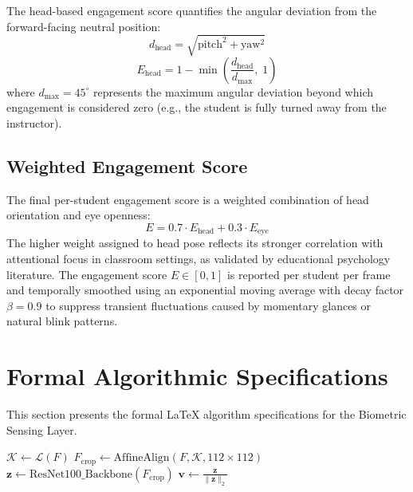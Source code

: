 \documentclass[12pt,a4paper,oneside]{report}
\begin{document}
The head-based engagement score quantifies the angular deviation from the forward-facing neutral position:
\begin{equation}
    d_{\text{head}} = \sqrt{\text{pitch}^2 + \text{yaw}^2}
\end{equation}
\begin{equation}
    E_{\text{head}} = 1 - \min\left(\frac{d_{\text{head}}}{d_{\max}},\; 1\right)
\end{equation}
where $d_{\max} = 45^{\circ}$ represents the maximum angular deviation beyond which engagement is considered zero (e.g., the student is fully turned away from the instructor).

\subsection{Weighted Engagement Score}
The final per-student engagement score is a weighted combination of head orientation and eye openness:
\begin{equation}
    E = 0.7 \cdot E_{\text{head}} + 0.3 \cdot E_{\text{eye}}
\end{equation}
The higher weight assigned to head pose reflects its stronger correlation with attentional focus in classroom settings, as validated by educational psychology literature. The engagement score $E \in [0, 1]$ is reported per student per frame and temporally smoothed using an exponential moving average with decay factor $\beta = 0.9$ to suppress transient fluctuations caused by momentary glances or natural blink patterns.



\section{Formal Algorithmic Specifications}
This section presents the formal LaTeX algorithm specifications for the Biometric Sensing Layer.


\begin{algorithm}[H]
\caption{ArcFace Deep Biometric Feature Embedding Extraction}

$\mathcal{K} \leftarrow \mathcal{L}(F)$ 
$F_{\text{crop}} \leftarrow \text{AffineAlign}(F, \mathcal{K}, 112 \times 112)$ 
$\mathbf{z} \leftarrow \text{ResNet100\_Backbone}(F_{\text{crop}})$ 
$\mathbf{v} \leftarrow \frac{\mathbf{z}}{\|\mathbf{z}\|_2}$ 
\;
\end{algorithm}
\end{document}
